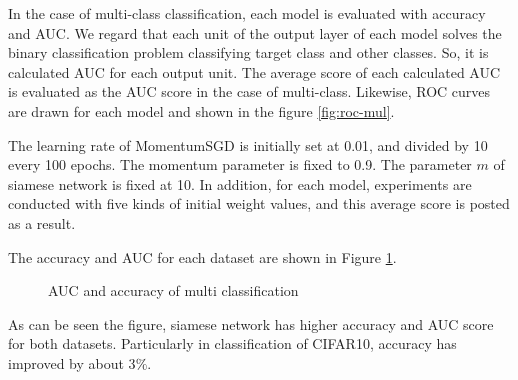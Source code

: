 \documentclass[twocolumn,10pt]{article}
\begin{document}
In the case of multi-class classification, each model is evaluated with accuracy and AUC.
We regard that each unit of the output layer of each model solves the binary classification problem classifying target class and other classes.
So, it is calculated AUC for each output unit.
The average score of each calculated AUC is evaluated as the AUC score in the case of multi-class. 
Likewise, ROC curves are drawn for each model and shown in the figure \ref{fig:roc-mul}. \par
The learning rate of MomentumSGD is initially set at 0.01,  and  divided  by  10  every  100 epochs.  
The  momentum parameter  is  fixed  to  0.9.  
The parameter $m$ of siamese network is fixed at 10.
In  addition,  for  each  model,  experiments  are conducted  with  five  kinds  of  initial  weight  values,  and  this average score is posted as a result. \par
The accuracy and AUC for each dataset are shown in Figure \ref{fig: multi auc and acc}.
\begin{figure}[ht]
\begin{center}
\end{center}
\caption{AUC and accuracy of multi classification}
\label{fig: multi auc and acc}
\end{figure} \par
As can be seen the figure, siamese network has higher accuracy and AUC score for both datasets.
Particularly in classification of CIFAR10, accuracy has improved by about 3$\%$. \par
\end{document}
